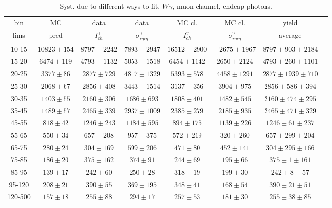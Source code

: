 \begin{table}[h]
  \tiny
  \begin{center}
  \caption{Syst. due to different ways to fit. $W\gamma$, muon channel, endcap photons.}
  \begin{tabular}{|c|c|c|c|c|c|c|c|}
    bin &  MC   & data  & data  & MC cl. & MC cl. & yield \\ 
    lims & pred & $I_{ch}^{\gamma}$ & $\sigma_{i\eta i\eta}^\gamma$  & $I_{ch}^{\gamma}$  & $\sigma_{i\eta i\eta}^\gamma$   & average\\ \hline
    10-15 & $10823\pm154$ & $8797\pm2242$ & $7893\pm2947$ & $16512\pm2900$ & $-2675\pm1967$ &$8797\pm903\pm2184$  \\ \hline
    15-20 & $6474\pm119$ & $4793\pm1132$ & $5053\pm1518$ & $6454\pm1142$ & $2650\pm2124$ &$4793\pm260\pm1101$  \\ \hline
    20-25 & $3377\pm86$ & $2877\pm729$ & $4817\pm1329$ & $5393\pm578$ & $4458\pm1291$ &$2877\pm1939\pm710$  \\ \hline
    25-30 & $2068\pm67$ & $2856\pm408$ & $3443\pm1514$ & $3137\pm356$ & $3904\pm975$ &$2856\pm586\pm394$  \\ \hline
    30-35 & $1403\pm55$ & $2160\pm306$ & $1686\pm693$ & $1808\pm401$ & $1482\pm545$ &$2160\pm474\pm295$  \\ \hline
    35-45 & $1489\pm57$ & $2465\pm339$ & $2937\pm1009$ & $2385\pm279$ & $2185\pm935$ &$2465\pm471\pm329$  \\ \hline
    45-55 & $818\pm42$ & $1246\pm243$ & $1184\pm595$ & $894\pm176$ & $1139\pm226$ &$1246\pm61\pm237$  \\ \hline
    55-65 & $550\pm34$ & $657\pm208$ & $957\pm375$ & $572\pm219$ & $320\pm260$ &$657\pm299\pm204$  \\ \hline
    65-75 & $280\pm24$ & $304\pm169$ & $599\pm206$ & $471\pm80$ & $452\pm141$ &$304\pm295\pm166$  \\ \hline
    75-85 & $186\pm20$ & $375\pm162$ & $374\pm91$ & $244\pm69$ & $195\pm66$ &$375\pm1\pm161$  \\ \hline
    85-95 & $139\pm17$ & $242\pm60$ & $250\pm28$ & $318\pm19$ & $199\pm30$ &$242\pm8\pm57$  \\ \hline
    95-120 & $208\pm21$ & $390\pm55$ & $369\pm195$ & $348\pm41$ & $168\pm54$ &$390\pm21\pm51$  \\ \hline
    120-500 & $157\pm18$ & $255\pm88$ & $294\pm17$ & $257\pm53$ & $181\pm30$ &$255\pm38\pm85$  \\ \hline
  \end{tabular}
  \label{tab:diff_ways_to_fit_phoEt_ENDCAP_muon}
  \end{center}
\end{table}

